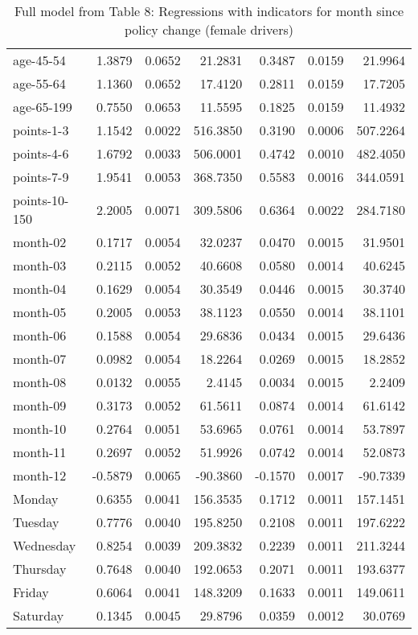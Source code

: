 \documentclass[10pt]{article}
\begin{document}
\begin{table}[ht]
\begin{tabular}{lrrrrrr}
  age-45-54 & 1.3879 & 0.0652 & 21.2831 & 0.3487 & 0.0159 & 21.9964 \\ 
  age-55-64 & 1.1360 & 0.0652 & 17.4120 & 0.2811 & 0.0159 & 17.7205 \\ 
  age-65-199 & 0.7550 & 0.0653 & 11.5595 & 0.1825 & 0.0159 & 11.4932 \\ 
  points-1-3 & 1.1542 & 0.0022 & 516.3850 & 0.3190 & 0.0006 & 507.2264 \\ 
  points-4-6 & 1.6792 & 0.0033 & 506.0001 & 0.4742 & 0.0010 & 482.4050 \\ 
  points-7-9 & 1.9541 & 0.0053 & 368.7350 & 0.5583 & 0.0016 & 344.0591 \\ 
  points-10-150 & 2.2005 & 0.0071 & 309.5806 & 0.6364 & 0.0022 & 284.7180 \\ 
  month-02 & 0.1717 & 0.0054 & 32.0237 & 0.0470 & 0.0015 & 31.9501 \\ 
  month-03 & 0.2115 & 0.0052 & 40.6608 & 0.0580 & 0.0014 & 40.6245 \\ 
  month-04 & 0.1629 & 0.0054 & 30.3549 & 0.0446 & 0.0015 & 30.3740 \\ 
  month-05 & 0.2005 & 0.0053 & 38.1123 & 0.0550 & 0.0014 & 38.1101 \\ 
  month-06 & 0.1588 & 0.0054 & 29.6836 & 0.0434 & 0.0015 & 29.6436 \\ 
  month-07 & 0.0982 & 0.0054 & 18.2264 & 0.0269 & 0.0015 & 18.2852 \\ 
  month-08 & 0.0132 & 0.0055 & 2.4145 & 0.0034 & 0.0015 & 2.2409 \\ 
  month-09 & 0.3173 & 0.0052 & 61.5611 & 0.0874 & 0.0014 & 61.6142 \\ 
  month-10 & 0.2764 & 0.0051 & 53.6965 & 0.0761 & 0.0014 & 53.7897 \\ 
  month-11 & 0.2697 & 0.0052 & 51.9926 & 0.0742 & 0.0014 & 52.0873 \\ 
  month-12 & -0.5879 & 0.0065 & -90.3860 & -0.1570 & 0.0017 & -90.7339 \\ 
  Monday & 0.6355 & 0.0041 & 156.3535 & 0.1712 & 0.0011 & 157.1451 \\ 
  Tuesday & 0.7776 & 0.0040 & 195.8250 & 0.2108 & 0.0011 & 197.6222 \\ 
  Wednesday & 0.8254 & 0.0039 & 209.3832 & 0.2239 & 0.0011 & 211.3244 \\ 
  Thursday & 0.7648 & 0.0040 & 192.0653 & 0.2071 & 0.0011 & 193.6377 \\ 
  Friday & 0.6064 & 0.0041 & 148.3209 & 0.1633 & 0.0011 & 149.0611 \\ 
  Saturday & 0.1345 & 0.0045 & 29.8796 & 0.0359 & 0.0012 & 30.0769 \\ 
   \hline
\end{tabular}
\caption{Full model from Table 8: Regressions with indicators for month since policy change (female drivers)} 
\label{tab_8_all_pts_no_age_F}
\end{table}


\clearpage
\pagebreak



\end{document}
